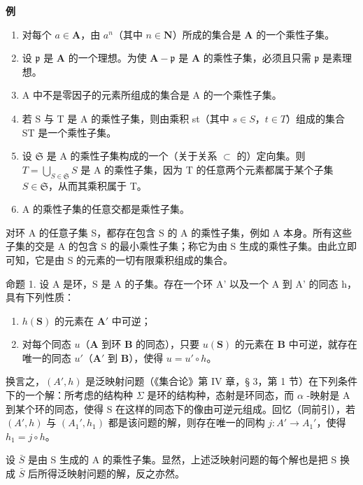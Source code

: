 \textbf{例}\par

\begin{enumerate}
\def\labelenumi{(\arabic{enumi})}
\item
  对每个 \(a \in \mathbf{A}\)，由 \(a^n\)（其中 \(n \in \mathbf{N}\)）所成的集合是 \(\mathbf{A}\) 的一个乘性子集。
\item
  设 \(\mathfrak{p}\) 是 \(\mathbf{A}\) 的一个理想。为使 \(\mathbf{A} - \mathfrak{p}\) 是 \(\mathbf{A}\) 的乘性子集，必须且只需 \(\mathfrak{p}\) 是素理想。
\item
  A 中不是零因子的元素所组成的集合是 A 的一个乘性子集。
\item
  若 S 与 T 是 A 的乘性子集，则由乘积 st（其中 \(s \in S\)，\(t \in T\)）组成的集合 ST 是一个乘性子集。
\item
  设 \(\mathfrak{S}\) 是 A 的乘性子集构成的一个（关于关系 \(\subset\) 的）定向集。则 \(T = \bigcup_{S \in \mathfrak{S}} S\) 是 A 的乘性子集，因为 T 的任意两个元素都属于某个子集 \(S \in \mathfrak{S}\)，从而其乘积属于 T。
\item
  A 的乘性子集的任意交都是乘性子集。
\end{enumerate}

对环 A 的任意子集 S，都存在包含 S 的 A 的乘性子集，例如 A 本身。所有这些子集的交是 A 的包含 S 的最小乘性子集；称它为由 S 生成的乘性子集。由此立即可知，它是由 S 的元素的一切有限乘积组成的集合。

命题 1. 设 A 是环，S 是 A 的子集。存在一个环 A' 以及一个 A 到 A' 的同态 h，具有下列性质：

\begin{enumerate}
\def\labelenumi{(\arabic{enumi})}
\item
  \(h(\mathbf{S})\) 的元素在 \(\mathbf{A}'\) 中可逆；
\item
  对每个同态 \(u\)（\(\mathbf{A}\) 到环 \(\mathbf{B}\) 的同态），只要 \(u(\mathbf{S})\) 的元素在 \(\mathbf{B}\) 中可逆，就存在唯一的同态 \(u'\)（\(\mathbf{A}'\) 到 \(\mathbf{B}\)），使得 \(u = u' \circ h\)。
\end{enumerate}

换言之，\((A', h)\) 是泛映射问题（《集合论》第 IV 章，§ 3，第 1 节）在下列条件下的一个解：所考虑的结构种 \(\Sigma\) 是环的结构种，态射是环同态，而 \(\alpha\) -映射是 A 到某个环的同态，使得 S 在这样的同态下的像由可逆元组成。回忆（同前引），若 \((A', h)\) 与 \((A_{1}', h_{1})\) 都是该问题的解，则存在唯一的同构 \(j: A' \to A_{1}'\)，使得 \(h_{1} = j \circ h\)。

设 \(\bar{S}\) 是由 S 生成的 A 的乘性子集。显然，上述泛映射问题的每个解也是把 S 换成 \(\bar{S}\) 后所得泛映射问题的解，反之亦然。


